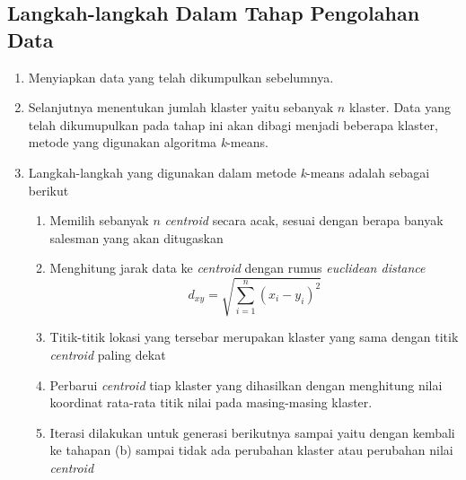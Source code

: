 \subsection{Langkah-langkah Dalam Tahap Pengolahan Data}
\begin{enumerate}
    \item Menyiapkan data yang telah dikumpulkan sebelumnya.
    \item Selanjutnya menentukan jumlah klaster yaitu sebanyak $n$ klaster. Data yang telah dikumupulkan pada tahap ini akan dibagi menjadi beberapa klaster, metode yang digunakan algoritma \textit{k}-means.
    \item Langkah-langkah yang digunakan dalam metode \textit{k}-means adalah sebagai berikut
    \begin{enumerate}
        \item Memilih sebanyak $n$ \textit{centroid} secara acak, sesuai dengan berapa banyak salesman yang akan ditugaskan
        \item Menghitung jarak data ke \textit{centroid} dengan rumus \textit{euclidean distance}
        \begin{equation}
        d_{xy}=\sqrt{\sum_{i=1}^{n}(x_i-y_i)^{2}}
        \end{equation}
        \item Titik-titik lokasi yang tersebar merupakan klaster yang sama dengan titik \textit{centroid} paling dekat
        \item Perbarui \textit{centroid} tiap klaster yang dihasilkan dengan menghitung nilai koordinat rata-rata titik nilai pada masing-masing klaster.
        \item Iterasi dilakukan untuk generasi berikutnya sampai yaitu dengan kembali ke tahapan (b) sampai tidak ada perubahan klaster atau perubahan nilai \textit{centroid}
    \end{enumerate}
	

\end{enumerate}
